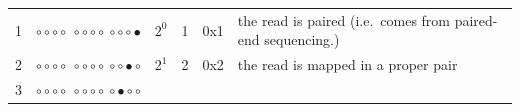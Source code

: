 \documentclass[]{krantz}
\begin{document}
\begin{longtable}[]{@{}llllll@{}}
\midrule
\endhead
\begin{minipage}[t]{0.09\columnwidth}\raggedright
1\strut
\end{minipage} & \begin{minipage}[t]{0.12\columnwidth}\raggedright
\({\circ}{\circ}{\circ}{\circ}~{\circ}{\circ}{\circ}{\circ}~{\circ}{\circ}{\circ}{\bullet}\)\strut
\end{minipage} & \begin{minipage}[t]{0.12\columnwidth}\raggedright
\(2^0\)\strut
\end{minipage} & \begin{minipage}[t]{0.07\columnwidth}\raggedright
1\strut
\end{minipage} & \begin{minipage}[t]{0.09\columnwidth}\raggedright
0x1\strut
\end{minipage} & \begin{minipage}[t]{0.35\columnwidth}\raggedright
the read is paired (i.e.~comes
from paired-end sequencing.)\strut
\end{minipage}\tabularnewline
\begin{minipage}[t]{0.09\columnwidth}\raggedright
2\strut
\end{minipage} & \begin{minipage}[t]{0.12\columnwidth}\raggedright
\({\circ}{\circ}{\circ}{\circ}~{\circ}{\circ}{\circ}{\circ}~{\circ}{\circ}{\bullet}{\circ}\)\strut
\end{minipage} & \begin{minipage}[t]{0.12\columnwidth}\raggedright
\(2^1\)\strut
\end{minipage} & \begin{minipage}[t]{0.07\columnwidth}\raggedright
2\strut
\end{minipage} & \begin{minipage}[t]{0.09\columnwidth}\raggedright
0x2\strut
\end{minipage} & \begin{minipage}[t]{0.35\columnwidth}\raggedright
the read is mapped in a proper
pair\strut
\end{minipage}\tabularnewline
\begin{minipage}[t]{0.09\columnwidth}\raggedright
3\strut
\end{minipage} & \begin{minipage}[t]{0.12\columnwidth}\raggedright
\({\circ}{\circ}{\circ}{\circ}~{\circ}{\circ}{\circ}{\circ}~{\circ}{\bullet}{\circ}{\circ}\)\strut
\end{minipage} & \begin{minipage}[t]{0.12\columnwidth}\raggedright

\end{minipage}
\end{longtable}
\end{document}
